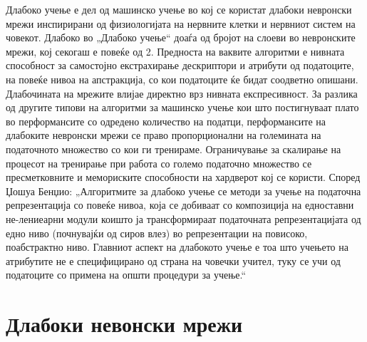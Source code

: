 Длабоко учење е дел од машинско учење во кој се користат длабоки невронски мрежи инспирирани од физиологијата на нервните клетки и нервниот систем на човекот. Длабоко во „Длабоко учење“ доаѓа од бројот на слоеви во невронските мрежи, кој секогаш е повеќе од 2. Предноста на ваквите алгоритми е нивната способност за самостојно екстрахирање дескриптори и атрибути од податоците, на повеќе нивоа на апстракција, со кои податоците ќе бидат соодветно опишани. Длабочината на мрежите влијае директно врз нивната експресивност. За разлика од другите типови на алгоритми за машинско учење кои што постигнуваат плато во перформансите со одредено количество на податци, перформансите на длабоките невронски мрежи се право пропорционални на големината на податочното множество со кои ги тренираме. Ограничување за скалирање на процесот на тренирање при работа со големо податочно множество се пресметковните и мемориските способности на хардверот кој се користи.
Според Џошуа Бенџио: „Алгоритмите за длабоко учење се методи за учење на податочна репрезентација со повеќе нивоа, која се добиваат со композиција на едноставни не-лениеарни модули коишто ја трансформираат податочната репрезентацијата од едно ниво (почнувајќи од сиров влез) во репрезентации на повисоко, поабстрактно ниво. Главниот аспект на длабокото учење е тоа што учењето на атрибутите не е специфицирано од страна на човечки учител, туку се учи од податоците со примена на општи процедури за учење.“
 
\section{Длабоки невонски мрежи}

